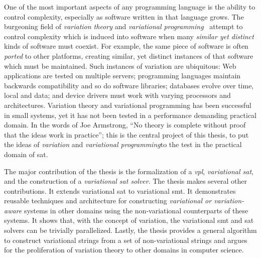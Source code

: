 One of the most important aspects of any programming language is the ability to
control complexity, especially as software written in that language grows. The
burgeoning field of \emph{variation theory} and \emph{variational
  programming}~\cite{EW11gttse,EW11tosem,HW16fosd,CEW16ecoop,Walk14onward}
attempt to control complexity which is induced into software when many
\emph{similar yet distinct} kinds of software must coexist. For example, the
same piece of software is often \emph{ported} to other platforms, creating
similar, yet distinct instances of that software which must be maintained. Such
instances of variation are ubiquitous: Web applications are tested on multiple
servers; programming languages maintain backwards compatibility and so do
software libraries; databases evolve over time, local and data; and device
drivers must work with varying processors and architectures. Variation theory
and variational programming has been successful in small systems, yet
it has not been tested in a performance demanding practical domain. In the words
of Joe Armstrong\cite{armstrongThesis}, ``No theory is complete without proof
that the ideas work in practice''; this is the central project of this thesis,
to put the ideas of \emph{variation} and \emph{variational programming}to the
test in the practical domain of \ac{sat}.

The major contribution of the thesis is the formalization of a \emph{\ac{vpl}},
\emph{variational \acl{sat}}, and the construction of a \emph{variational
  \ac{sat} solver}. The thesis makes several other contributions. It extends
variational \acl{sat} to variational \ac{smt}. It demonstrates reusable
techniques and architecture for constructing \emph{variational or
  variation-aware} systems in other domains using the non-variational
counterparts of these systems. It shows that, with the concept of variation, the
variational \ac{smt} and \ac{sat} solvers can be trivially parallelized. Lastly,
the thesis provides a general algorithm to construct variational strings from a
set of non-variational strings and argues for the proliferation of variation
theory to other domains in computer science.

